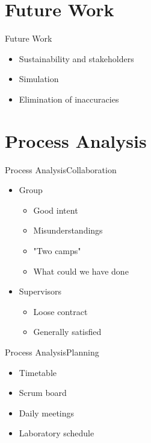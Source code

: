 \section{Future Work}
\begin{frame}{Future Work}
\begin{itemize}
    \item Sustainability and stakeholders
    \item Simulation
    \item Elimination of inaccuracies
\end{itemize}
\end{frame}

\section{Process Analysis}
\begin{frame}{Process Analysis}{Collaboration}
\begin{itemize}
    \item Group
    \begin{itemize}
        \item Good intent
        \item Misunderstandings
        \item "Two camps"
        \item What could we have done
    \end{itemize}
    \item Supervisors
    \begin{itemize}
        \item Loose contract
        \item Generally satisfied
    \end{itemize}
\end{itemize}
\end{frame}

\begin{frame}{Process Analysis}{Planning}
\begin{itemize}
    \item Timetable
    \item Scrum board
    \item Daily meetings
    \item Laboratory schedule
\end{itemize}
\end{frame}